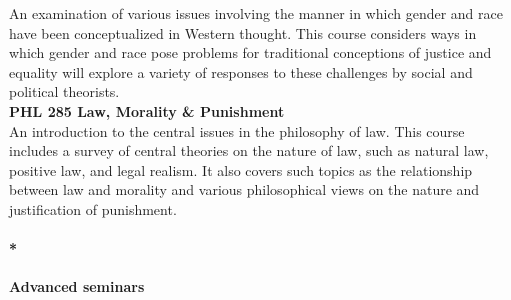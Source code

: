 \documentclass[
  letterpaper,
]{scrbook}
\let\oldparagraph\paragraph
\renewcommand{\paragraph}[1]{\oldparagraph{#1}\mbox{}}
\begin{document}
An examination of various issues involving the manner in which gender
and race have been conceptualized in Western thought. This course
considers ways in which gender and race pose problems for traditional
conceptions of justice and equality will explore a variety of responses
to these challenges by social and political theorists.\\
\textbf{PHL 285 Law, Morality \& Punishment}\\
An introduction to the central issues in the philosophy of law. This
course includes a survey of central theories on the nature of law, such
as natural law, positive law, and legal realism. It also covers such
topics as the relationship between law and morality and various
philosophical views on the nature and justification of punishment.

\paragraph*{\texorpdfstring{\textbf{Advanced
seminars}}{Advanced seminars}}\label{advanced-seminars}
\end{document}
